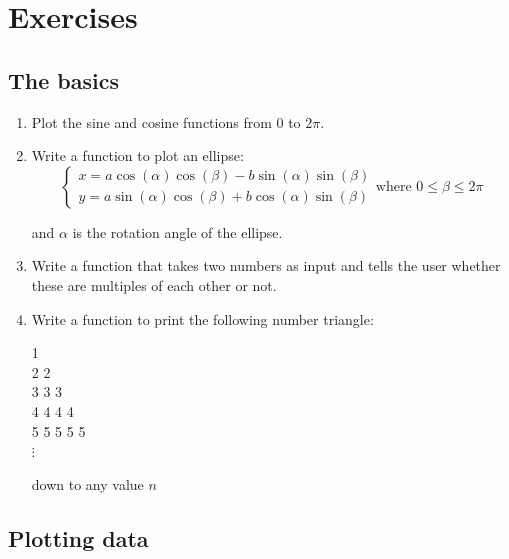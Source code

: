 \chapter{Exercises}
\label{ch:exercises}

\section{The basics}
\label{sec:ex-basics}

\begin{enumerate}
\item Plot the sine and cosine functions from 0 to 2$\pi$.
  
\item Write a function to plot an ellipse:
  \[
  \begin{cases}
    x = a\cos(\alpha)\cos(\beta) - b\sin(\alpha)\sin(\beta)\\
    y = a\sin(\alpha)\cos(\beta) + b\cos(\alpha)\sin(\beta)
  \end{cases}
  \mbox{where~}0 \leq \beta \leq 2\pi
  \]

  \noindent and $\alpha$ is the rotation angle of the ellipse.
  
\item Write a function that takes two numbers as input and tells the
  user whether these are multiples of each other or not.

\item Write a function to print the following number triangle:

  1\\
  2 2\\
  3 3 3\\
  4 4 4 4\\
  5 5 5 5 5\\
  $\vdots$
  
  down to any value $n$
  
\end{enumerate}

\section{Plotting data}
\label{sec:ex-plotting}

